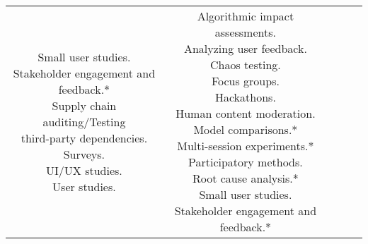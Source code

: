 \documentclass[fleqn]{article}
\begin{document}
\begin{landscape}
\begin{table}[H]
\begin{tabular}{|c|c|c|c|c|}
{			\textbullet\hspace{3pt} Small user studies. \\			
			\textbullet\hspace{3pt} Stakeholder engagement and \\\hspace{10pt}feedback.* \\			
			\textbullet\hspace{3pt} Supply chain auditing/Testing  \\\hspace{10pt}third-party dependencies. \\			
			\textbullet\hspace{3pt} Surveys. \\			
			\textbullet\hspace{3pt} UI/UX studies. \\			
			\textbullet\hspace{3pt} User studies. \\
		} 
		&
		\makecell[l]{ 	
			\textbullet\hspace{3pt} Algorithmic impact assessments.\\ 		
			\textbullet\hspace{3pt} Analyzing user feedback. \\	
			\textbullet\hspace{3pt} Chaos testing. \\
			\textbullet\hspace{3pt} Focus groups. \\
			\textbullet\hspace{3pt} Hackathons. \\
			\textbullet\hspace{3pt} Human content moderation. \\
			\textbullet\hspace{3pt} Model comparisons.* \\
			\textbullet\hspace{3pt} Multi-session experiments.* \\
			\textbullet\hspace{3pt} Participatory methods. \\			
			\textbullet\hspace{3pt} Root cause analysis.* \\			
			\textbullet\hspace{3pt} Small user studies. \\			
			\textbullet\hspace{3pt} Stakeholder engagement and \\\hspace{10pt}feedback.* \\
}
\end{tabular}
\end{table}
\end{landscape}
\end{document}
